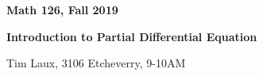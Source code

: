 \documentclass[12pt,letterpaper]{article}
\begin{document}
\thispagestyle{empty}
$ $
\vfill
\begin{center}

\centerline{\huge \textbf{Math 126, Fall 2019}}
\centerline{\Large \textbf{Introduction to Partial Differential Equation}} 
\centerline{ Tim Laux, 3106 Etcheverry, 9-10AM}
\end{center}
\vfill
$ $
\newpage
\thispagestyle{empty}
\tableofcontents
\newpage
\setcounter{page}{1}

\end{document}
